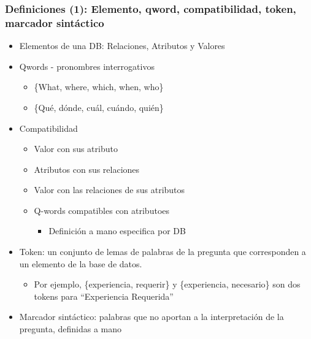 \fontsize{9.5pt}{7.2}\selectfont
\begin{frame}
  \frametitle{Definiciones (1): Elemento, qword, compatibilidad, token, marcador sintáctico}
   \begin{itemize}
      \item Elementos de una DB: Relaciones, Atributos y Valores
      \item Qwords - pronombres interrogativos
      \begin{itemize}
          \item \{What, where, which, when, who\}
          \item \{Qué, dónde, cuál, cuándo, quién\}
      \end{itemize}
      \item Compatibilidad 
      \begin{itemize}
          \item Valor con sus atributo
          \item Atributos con sus relaciones
          \item Valor con las relaciones de sus atributos
          \item Q-words compatibles con atributoes
          \begin{itemize}
            \item Definición a mano especifica por DB
          \end{itemize}
      \end{itemize}
      \item Token: un conjunto de lemas de palabras de la pregunta que corresponden a un elemento de la base de datos.
      \begin{itemize}
            \item Por ejemplo, \{experiencia, requerir\} y \{experiencia, necesario\} son dos tokens para ``Experiencia Requerida''
      \end{itemize}
      \item Marcador sintáctico: palabras que no aportan a la interpretación de la pregunta, definidas a mano
    \end{itemize}
\end{frame}

